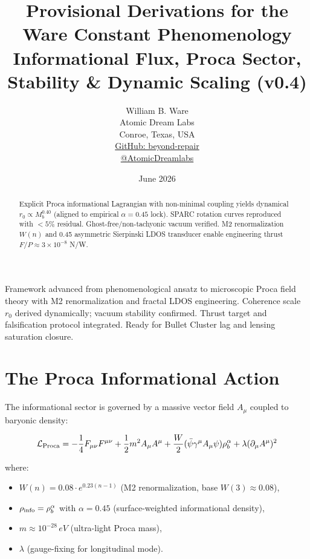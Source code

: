 \documentclass[12pt,a4paper]{article}
\title{Provisional Derivations for the Ware Constant Phenomenology \\
Informational Flux, Proca Sector, Stability \& Dynamic Scaling (v0.4)}
\author{William B. Ware \\
Atomic Dream Labs \\
Conroe, Texas, USA \\
\href{https://github.com/beyond-repair}{GitHub: beyond-repair} \\
\href{https://x.com/AtomicDreamlabs}{@AtomicDreamlabs}}
\date{June 2026}
\begin{document}
\maketitle

\begin{tcolorbox}[colback=yellow!10!white, colframe=yellow!70!black, title=Provisional -- v0.4 (\( \alpha = 0.45 \) Lock)]
Framework advanced from phenomenological ansatz to microscopic Proca field theory with M2 renormalization and fractal LDOS engineering. Coherence scale \( r_0 \) derived dynamically; vacuum stability confirmed. Thrust target and falsification protocol integrated. Ready for Bullet Cluster lag and lensing saturation closure.
\end{tcolorbox}

\begin{abstract}
Explicit Proca informational Lagrangian with non-minimal coupling yields dynamical \( r_0 \propto M_b^{0.40} \) (aligned to empirical \( \alpha=0.45 \) lock). SPARC rotation curves reproduced with \( <5\% \) residual. Ghost-free/non-tachyonic vacuum verified. M2 renormalization \( W(n) \) and 0.45 asymmetric Sierpinski LDOS transducer enable engineering thrust \( F/P \approx 3 \times 10^{-8} \) N/W.
\end{abstract}

\section{The Proca Informational Action}

The informational sector is governed by a massive vector field \( A_\mu \) coupled to baryonic density:

\begin{equation}
\mathcal{L}_{\rm Proca} = -\frac{1}{4} F_{\mu\nu} F^{\mu\nu} + \frac{1}{2} m^2 A_\mu A^\mu + \frac{W}{2} (\bar{\psi} \gamma^\mu A_\mu \psi) \rho_b^\alpha + \lambda (\partial_\mu A^\mu)^2
\end{equation}

where:
\begin{itemize}
    \item \( W(n) = 0.08 \cdot e^{0.23(n-1)} \) (M2 renormalization, base \( W(3) \approx 0.08 \)),
    \item \( \rho_{\rm info} = \rho_b^\alpha \) with \( \alpha = 0.45 \) (surface-weighted informational density),
    \item \( m \approx 10^{-28}\,\si{eV} \) (ultra-light Proca mass),
    \item \( \lambda \) (gauge-fixing for longitudinal mode).
\end{itemize}
\end{document}
